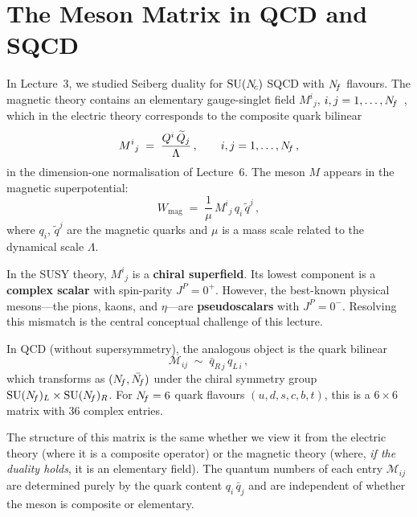 \documentclass[11pt,a4paper]{article}
\begin{document}
\section{The Meson Matrix in QCD and SQCD}
\label{sec:meson-matrix-intro}

In Lecture~3, we studied Seiberg duality for $\mathrm{SU}(N_{\!c})$ SQCD with
$N_{\!f}$ flavours.  The magnetic theory contains an elementary gauge-singlet
field $M^i{}_j$, $i,j = 1,\ldots,N_{\!f}$~\cite{Seiberg1995}, which in the
electric theory corresponds to the composite quark bilinear
\begin{equation}\label{eq:meson-susy}
  M^i{}_j \;=\; \frac{Q^i\,\widetilde{Q}_j}{\Lambda}\,,
  \qquad i,j = 1,\ldots,N_{\!f}\,,
\end{equation}
in the dimension-one normalisation of Lecture~6.  The meson $M$ appears in
the magnetic superpotential:
\begin{equation}\label{eq:W-mag}
  W_{\text{mag}} \;=\; \frac{1}{\mu}\, M^i{}_j\, q_i\,\widetilde{q}^j\,,
\end{equation}
where $q_i$, $\widetilde{q}^j$ are the magnetic quarks and $\mu$ is
a mass scale related to the dynamical scale $\Lambda$.

\begin{warningbox}[title={The meson $M$ is a chiral superfield}]
In the SUSY theory, $M^i{}_j$ is a \textbf{chiral superfield}.  Its
lowest component is a \textbf{complex scalar} with spin-parity
$J^P = 0^+$.  However, the best-known physical mesons---the pions,
kaons, and $\eta$---are \textbf{pseudoscalars} with $J^P = 0^-$.
Resolving this mismatch is the central conceptual challenge of this
lecture.
\end{warningbox}

In QCD (without supersymmetry), the analogous object is the quark
bilinear
\begin{equation}\label{eq:meson-qcd}
  \mathcal{M}_{ij} \;\sim\; \bar{q}_{R\,j}\, q_{L\,i}\,,
\end{equation}
which transforms as $(N_{\!f}, \bar{N_{\!f}})$ under the chiral symmetry group
$\mathrm{SU}(N_{\!f})_L \times \mathrm{SU}(N_{\!f})_R$.  For $N_{\!f} = 6$ quark flavours
$(u, d, s, c, b, t)$, this is a $6 \times 6$ matrix with $36$ complex
entries.

The structure of this matrix is the same whether we view it from the
electric theory (where it is a composite operator) or the magnetic
theory (where, \emph{if the duality holds}, it is an elementary field).
The quantum numbers of each entry $\mathcal{M}_{ij}$ are determined
purely by the quark content $q_i\,\bar{q}_j$ and are independent of
whether the meson is composite or elementary.
\end{document}
